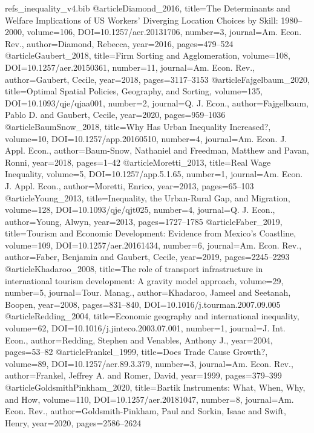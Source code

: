 \begin{filecontents*}[overwrite]{refs_inequality_v4.bib}
@article{Diamond_2016, title={The Determinants and Welfare Implications of {US} Workers' Diverging Location Choices by Skill: 1980--2000}, volume={106}, DOI={10.1257/aer.20131706}, number={3}, journal={Am. Econ. Rev.}, author={Diamond, Rebecca}, year={2016}, pages={479--524} }
@article{Gaubert_2018, title={Firm Sorting and Agglomeration}, volume={108}, DOI={10.1257/aer.20150361}, number={11}, journal={Am. Econ. Rev.}, author={Gaubert, Cecile}, year={2018}, pages={3117--3153} }
@article{Fajgelbaum_2020, title={Optimal Spatial Policies, Geography, and Sorting}, volume={135}, DOI={10.1093/qje/qjaa001}, number={2}, journal={Q. J. Econ.}, author={Fajgelbaum, Pablo D. and Gaubert, Cecile}, year={2020}, pages={959--1036} }
@article{BaumSnow_2018, title={Why Has Urban Inequality Increased?}, volume={10}, DOI={10.1257/app.20160510}, number={4}, journal={Am. Econ. J. Appl. Econ.}, author={Baum-Snow, Nathaniel and Freedman, Matthew and Pavan, Ronni}, year={2018}, pages={1--42} }
@article{Moretti_2013, title={Real Wage Inequality}, volume={5}, DOI={10.1257/app.5.1.65}, number={1}, journal={Am. Econ. J. Appl. Econ.}, author={Moretti, Enrico}, year={2013}, pages={65--103} }
@article{Young_2013, title={Inequality, the Urban-Rural Gap, and Migration}, volume={128}, DOI={10.1093/qje/qjt025}, number={4}, journal={Q. J. Econ.}, author={Young, Alwyn}, year={2013}, pages={1727--1785} }
@article{Faber_2019, title={Tourism and Economic Development: Evidence from {Mexico}'s Coastline}, volume={109}, DOI={10.1257/aer.20161434}, number={6}, journal={Am. Econ. Rev.}, author={Faber, Benjamin and Gaubert, Cecile}, year={2019}, pages={2245--2293} }
@article{Khadaroo_2008, title={The role of transport infrastructure in international tourism development: A gravity model approach}, volume={29}, number={5}, journal={Tour. Manag.}, author={Khadaroo, Jameel and Seetanah, Boopen}, year={2008}, pages={831--840}, DOI={10.1016/j.tourman.2007.09.005} }
@article{Redding_2004, title={Economic geography and international inequality}, volume={62}, DOI={10.1016/j.jinteco.2003.07.001}, number={1}, journal={J. Int. Econ.}, author={Redding, Stephen and Venables, Anthony J.}, year={2004}, pages={53--82} }
@article{Frankel_1999, title={Does Trade Cause Growth?}, volume={89}, DOI={10.1257/aer.89.3.379}, number={3}, journal={Am. Econ. Rev.}, author={Frankel, Jeffrey A. and Romer, David}, year={1999}, pages={379--399} }
@article{GoldsmithPinkham_2020, title={{Bartik} Instruments: What, When, Why, and How}, volume={110}, DOI={10.1257/aer.20181047}, number={8}, journal={Am. Econ. Rev.}, author={Goldsmith-Pinkham, Paul and Sorkin, Isaac and Swift, Henry}, year={2020}, pages={2586--2624} }

\end{filecontents*}
